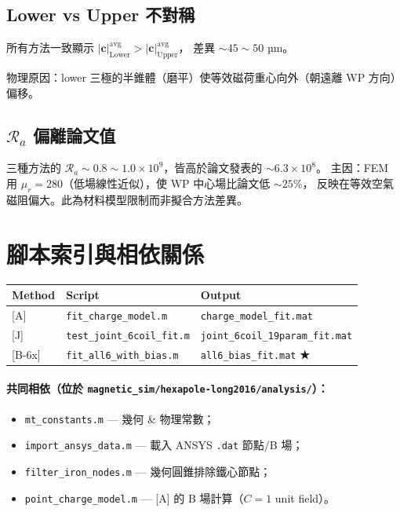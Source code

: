 \documentclass[11pt,a4paper]{article}
\newcommand{\Ra}{\mathcal{R}_a}
\newcommand{\cvec}{\mathbf{c}}
\begin{document}
\subsection{Lower vs Upper 不對稱}

所有方法一致顯示 \(|\cvec|_{\text{Lower}}^{\text{avg}} > |\cvec|_{\text{Upper}}^{\text{avg}}\)，
差異 \(\sim 45 \sim 50\) µm。
\par 物理原因：lower 三極的半錐體（磨平）使等效磁荷重心向外（朝遠離 WP 方向）偏移。

\subsection{\(\Ra\) 偏離論文值}

三種方法的 \(\Ra \sim 0.8 \sim 1.0 \times 10^9\)，皆高於論文發表的 \(\sim 6.3 \times 10^8\)。
主因：FEM 用 \(\mu_r = 280\)（低場線性近似），使 WP 中心場比論文低 \(\sim 25\%\)，
反映在等效空氣磁阻偏大。此為材料模型限制而非擬合方法差異。

\section{腳本索引與相依關係}

\begin{center}
\begin{tabular}{lll}
\toprule
Method   & Script                          & Output \\
\midrule
{[A]}    & \texttt{fit\_charge\_model.m}        & \texttt{charge\_model\_fit.mat} \\
{[J]}    & \texttt{test\_joint\_6coil\_fit.m}   & \texttt{joint\_6coil\_19param\_fit.mat} \\
{[B-6x]} & \texttt{fit\_all6\_with\_bias.m}     & \texttt{all6\_bias\_fit.mat} \;\textbf{★} \\
\bottomrule
\end{tabular}
\end{center}

\paragraph{共同相依（位於 \texttt{magnetic_sim/hexapole-long2016/analysis/}）：}
\begin{itemize}[leftmargin=*]
\item \texttt{mt\_constants.m} — 幾何 \& 物理常數；
\item \texttt{import\_ansys\_data.m} — 載入 ANSYS \texttt{.dat} 節點/B 場；
\item \texttt{filter\_iron\_nodes.m} — 幾何圓錐排除鐵心節點；
\item \texttt{point\_charge\_model.m} — [A] 的 B 場計算（\(C = 1\) unit field）。
\end{itemize}
\end{document}
